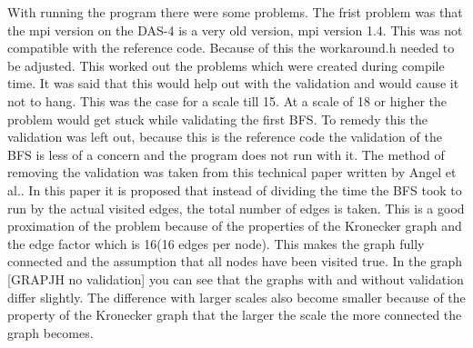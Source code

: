 With running the program there were some problems. The frist problem was
that the mpi version on the DAS-4 is a very old version, mpi version 1.4. This
was not compatible with the reference code. Because of this the workaround.h
needed to be adjusted. This worked out the problems which were created during compile time.
It was said that this would help out with the validation and would cause it not to hang. This
was the case for a scale till 15. At a scale of 18 or higher the problem would get stuck while
validating the first BFS. To remedy this the validation was left out, because this is the reference
code the validation of the BFS is less of a concern and the program does not run with it. The method
of removing the validation was taken from this technical paper written by Angel et al.\cite{angel2012graph}.
In this paper it is proposed that instead of dividing the time the BFS took to run by the actual visited edges,
the total number of edges is taken. This is a good proximation of the problem because of the properties
of the Kronecker graph and the edge factor which is 16(16 edges per node). This makes the graph fully connected
and the assumption that all nodes have been visited true. In the graph [GRAPJH no validation] you can see that
the graphs with and without validation differ slightly. The difference with larger scales also become smaller
because of the property of the Kronecker graph that the larger the scale the more connected the graph becomes.
